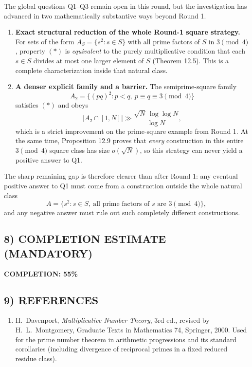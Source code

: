 The global questions Q1--Q3 remain open in this round, but the investigation has advanced in two mathematically substantive ways beyond Round 1.

\begin{enumerate}
\item \textbf{Exact structural reduction of the whole Round-1 square strategy.}
For sets of the form $A_S=\{s^2:s\in S\}$ with all prime factors of $S$ in $3\pmod 4$, property $(*)$ is \emph{equivalent} to the purely multiplicative condition that each $s\in S$ divides at most one larger element of $S$ (Theorem 12.5).
This is a complete characterization inside that natural class.

\item \textbf{A denser explicit family and a barrier.}
The semiprime-square family
\[
A_2=\{(pq)^2: p<q,\ p\equiv q\equiv 3\pmod 4\}
\]
satisfies $(*)$ and obeys
\[
|A_2\cap[1,N]|\gg \frac{\sqrt N\,\log\log N}{\log N},
\]
which is a strict improvement on the prime-square example from Round 1.
At the same time, Proposition 12.9 proves that \emph{every} construction in this entire $3\pmod 4$ square class has size $o(\sqrt N)$, so this strategy can never yield a positive answer to Q1.
\end{enumerate}

The sharp remaining gap is therefore clearer than after Round 1:
any eventual positive answer to Q1 must come from a construction outside the whole natural class
\[
A=\{s^2:s\in S,\ \text{all prime factors of $s$ are }3\pmod 4\},
\]
and any negative answer must rule out such completely different constructions.

\subsection*{8) COMPLETION ESTIMATE (MANDATORY)}

\textbf{COMPLETION: 55\%}

\subsection*{9) REFERENCES}

\begin{enumerate}
\item H.~Davenport, \emph{Multiplicative Number Theory}, 3rd ed., revised by H.~L.~Montgomery, Graduate Texts in Mathematics 74, Springer, 2000. Used for the prime number theorem in arithmetic progressions and its standard corollaries (including divergence of reciprocal primes in a fixed reduced residue class).
\end{enumerate}

